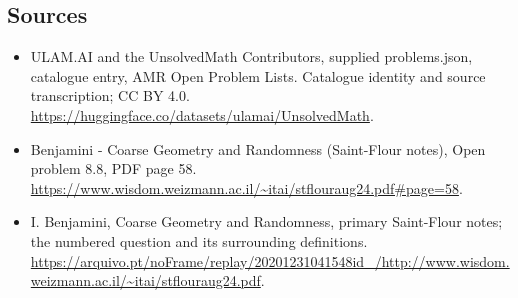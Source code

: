 \documentclass[11pt,a4paper]{article}
\begin{document}
\subsection{Sources}
\begin{itemize}
\item[S1] ULAM.AI and the UnsolvedMath Contributors, supplied problems.json, catalogue entry, AMR Open Problem Lists. Catalogue identity and source transcription; CC BY 4.0.
\url{https://huggingface.co/datasets/ulamai/UnsolvedMath}.
\item[S2] Benjamini - Coarse Geometry and Randomness (Saint-Flour notes), Open problem 8.8, PDF page 58. 
\url{https://www.wisdom.weizmann.ac.il/~itai/stflouraug24.pdf#page=58}.
\item[S3] I. Benjamini, Coarse Geometry and Randomness, primary Saint-Flour notes; the numbered question and its surrounding definitions.
\url{https://arquivo.pt/noFrame/replay/20201231041548id_/http://www.wisdom.weizmann.ac.il/~itai/stflouraug24.pdf}.
\end{itemize}
\end{document}
